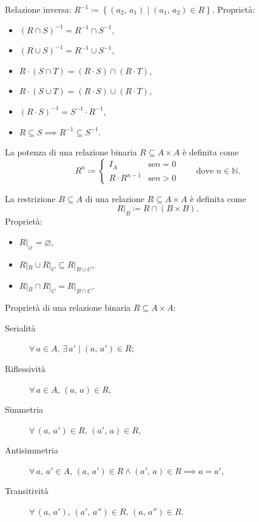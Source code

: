 \documentclass[10pt]{article}
\newcommand{\inv}[1]{{#1}^{-1}}
\newcommand{\N}{\mathbb{N}}
\renewcommand{\emptyset}{\varnothing}
\begin{document}
        Relazione inversa: \(\inv{R} \coloneqq \left\{(a_2, \, a_1) \; | \; (a_1, \, a_2) \in R\right\}\).
        Proprietà:
        \begin{itemize}
            \item \(\inv{(R \cap S)} = \inv{R} \cap \inv{S}\),
            \item \(\inv{(R \cup S)} = \inv{R} \cup \inv{S}\),
            \item \(R \cdot (S \cap T) = (R \cdot S) \cap (R \cdot T)\),
            \item \(R \cdot (S \cup T) = (R \cdot S) \cup (R \cdot T)\),
            \item \(\inv{(R \cdot S)} = \inv{S} \cdot \inv{R}\),
            \item \(R \subseteq S \implies \inv{R} \subseteq \inv{S}\).
        \end{itemize}

        La potenza di una relazione binaria \(R \subseteq A \times A\) è definita come
        \[
            R^{n} \coloneqq
            \begin{cases*}
                I_A & \text{se} n = 0\\
                R \cdot R^{n - 1} & \text{se} n > 0
            \end{cases*}
            \qquad \text{dove } n \in \N.
        \]

        La restrizione \(B \subseteq A\) di una relazione \(R \subseteq A \times A\) è definita come
        \[
            R|_B \coloneqq R \cap (B \times B).
        \]
        Proprietà:
        \begin{itemize}
            \item \(R|_\emptyset = \emptyset\),
            \item \(R|_B \cup R|_C \subseteq R|_{B \cup C}\),
            \item \(R|_B \cap R|_C = R|_{B \cap C}\).
        \end{itemize}

        Proprietà di una relazione binaria \(R \subseteq A \times A\):
        \begin{description}
            \item[Serialità] \(\forall \, a \in A, \, \exists \, a' \; | \; (a, \, a') \in R\);
            \item[Riflessività] \(\forall \, a \in A, \, (a, \, a) \in R\),
            \item[Simmetria] \(\forall \, (a, \, a') \in R, \, (a', \, a) \in R\),
            \item[Antisimmetria] \(\forall \, a, \, a' \in A, \, (a, \, a') \in R \land (a', \, a) \in R \implies a = a'\),
            \item[Transitività] \(\forall \, (a, \, a'), \, (a', \, a'') \in R, \, (a, \, a'') \in R\).
        \end{description}
    
\end{document}
